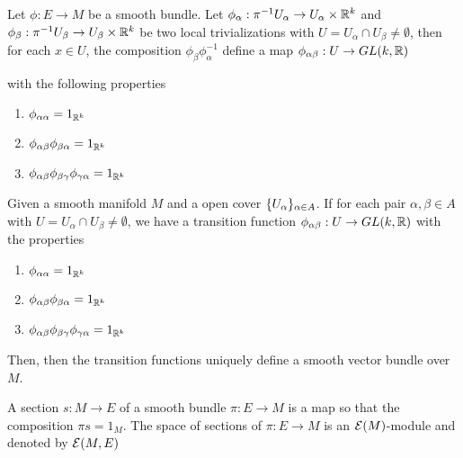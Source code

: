 \begin{proposition}
	Let $\phi: E \to M$ be a smooth bundle. Let $\phi_\alpha: \pi^{-1} U_\alpha \to U_\alpha \times \mathbb{R}^k$ and $\phi_\beta: \pi^{-1} U_\beta \to U_\beta \times \mathbb{R}^k$ be two local trivializations with $U = U_\alpha \cap U_\beta \neq \emptyset$, then for each $x \in U$, the composition $\phi_\beta \phi_\alpha^{-1}$ define a map $\phi_{\alpha \beta}: U \to GL(k, \mathbb{R})$
	\begin{center}
	\end{center}

	with the following properties
	\begin{enumerate}
		\item $\phi_{\alpha \alpha} = 1_{\mathbb{R}^k}$
		\item $\phi_{\alpha \beta} \phi_{\beta \alpha} = 1_{\mathbb{R}^k}$
		\item $\phi_{\alpha \beta} \phi_{\beta \gamma} \phi_{\gamma \alpha} = 1_{\mathbb{R}^k}$
	\end{enumerate}
\end{proposition}

\begin{proposition}
	Given a smooth manifold $M$ and a open cover $\{U_\alpha\}_{\alpha \in A}$. If for each pair $\alpha, \beta \in A$ with $U = U_\alpha \cap U_\beta \neq \emptyset$, we have a transition function $\phi_{\alpha \beta}: U \to GL(k, \mathbb{R})$ with the properties 
	\begin{enumerate}
		\item $\phi_{\alpha \alpha} = 1_{\mathbb{R}^k}$
		\item $\phi_{\alpha \beta} \phi_{\beta \alpha} = 1_{\mathbb{R}^k}$
		\item $\phi_{\alpha \beta} \phi_{\beta \gamma} \phi_{\gamma \alpha} = 1_{\mathbb{R}^k}$
	\end{enumerate}
	Then, then the transition functions uniquely define a smooth vector bundle over $M$.
\end{proposition}

\begin{definition}[section]
	A section $s: M \to E$ of a smooth bundle $\pi: E \to M$ is a map so that the composition $\pi s = 1_M$. The space of sections of $\pi: E \to M$ is an $\mathcal{E}(M)$-module and denoted by $\mathcal{E}(M, E)$
\end{definition}

